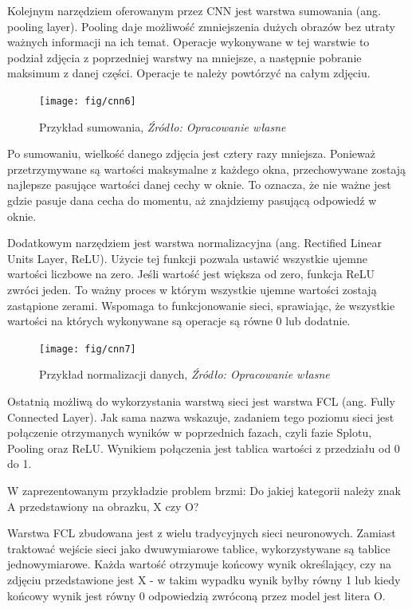 \documentclass[brudnopis]{xmgr}
\begin{document}
Kolejnym narzędziem oferowanym przez CNN jest warstwa sumowania (ang. pooling layer). Pooling daje możliwość zmniejszenia dużych obrazów bez utraty ważnych informacji na ich temat. Operacje wykonywane w tej warstwie to podział zdjęcia z poprzedniej warstwy na mniejsze, a następnie pobranie maksimum z danej części. Operacje te należy powtórzyć na całym zdjęciu.

\begin{figure}[!tbh]
\centering
\texttt{[image: fig/cnn6]}
\caption{Przykład sumowania, \emph{Źródło: Opracowanie własne}}
\end{figure}
\newpage

Po sumowaniu, wielkość danego zdjęcia jest cztery razy mniejsza. Ponieważ przetrzymywane są wartości maksymalne z każdego okna, przechowywane zostają najlepsze pasujące wartości danej cechy w oknie. To oznacza, że nie ważne jest gdzie pasuje dana cecha do momentu, aż znajdziemy pasującą odpowiedź w oknie.

Dodatkowym narzędziem jest warstwa normalizacyjna (ang. Rectified Linear Units Layer, ReLU). Użycie tej funkcji pozwala ustawić wszystkie ujemne wartości liczbowe na zero. Jeśli wartość jest większa od zero, funkcja ReLU zwróci jeden. To ważny proces w którym wszystkie ujemne wartości zostają zastąpione zerami. Wspomaga to funkcjonowanie sieci, sprawiając, że wszystkie wartości na których wykonywane są operacje są równe 0 lub dodatnie.

\begin{figure}[!tbh]
\centering
\texttt{[image: fig/cnn7]}
\caption{Przykład normalizacji danych, \emph{Źródło: Opracowanie własne}}
\end{figure}

Ostatnią możliwą do wykorzystania warstwą sieci jest warstwa FCL (ang. Fully Connected Layer). Jak sama nazwa wskazuje, zadaniem tego poziomu sieci jest połączenie otrzymanych wyników w poprzednich fazach, czyli fazie Splotu, Pooling oraz ReLU. Wynikiem połączenia jest tablica wartości z przedziału od 0 do 1. 
\newpage

W zaprezentowanym przykładzie problem brzmi: Do jakiej kategorii należy znak A przedstawiony na obrazku, X czy O?

Warstwa FCL zbudowana jest z wielu tradycyjnych sieci neuronowych. Zamiast traktować wejście sieci jako dwuwymiarowe tablice, wykorzystywane są tablice jednowymiarowe. Każda wartość otrzymuje końcowy wynik określający, czy na zdjęciu przedstawione jest X - w takim wypadku wynik byłby równy 1 lub kiedy końcowy wynik jest równy 0 odpowiedzią zwróconą przez model jest litera O.
\end{document}
